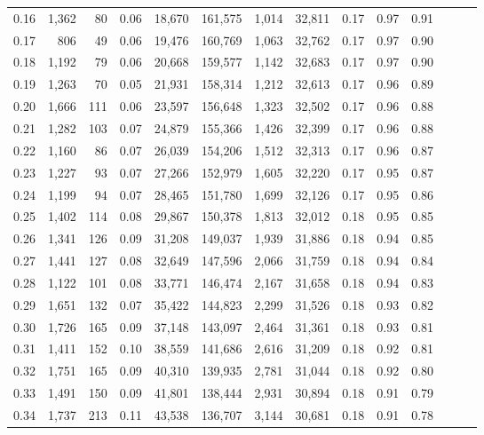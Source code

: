 \begin{tabular}{rrrrrrrrrrrrrr}
0.16 &  1,362 &   80 &  0.06 &   18,670 &  161,575 &   1,014 &  32,811 &  0.17 &  0.97 &      0.91 \\
0.17 &    806 &   49 &  0.06 &   19,476 &  160,769 &   1,063 &  32,762 &  0.17 &  0.97 &      0.90 \\
0.18 &  1,192 &   79 &  0.06 &   20,668 &  159,577 &   1,142 &  32,683 &  0.17 &  0.97 &      0.90 \\
0.19 &  1,263 &   70 &  0.05 &   21,931 &  158,314 &   1,212 &  32,613 &  0.17 &  0.96 &      0.89 \\
0.20 &  1,666 &  111 &  0.06 &   23,597 &  156,648 &   1,323 &  32,502 &  0.17 &  0.96 &      0.88 \\
0.21 &  1,282 &  103 &  0.07 &   24,879 &  155,366 &   1,426 &  32,399 &  0.17 &  0.96 &      0.88 \\
0.22 &  1,160 &   86 &  0.07 &   26,039 &  154,206 &   1,512 &  32,313 &  0.17 &  0.96 &      0.87 \\
0.23 &  1,227 &   93 &  0.07 &   27,266 &  152,979 &   1,605 &  32,220 &  0.17 &  0.95 &      0.87 \\
0.24 &  1,199 &   94 &  0.07 &   28,465 &  151,780 &   1,699 &  32,126 &  0.17 &  0.95 &      0.86 \\
0.25 &  1,402 &  114 &  0.08 &   29,867 &  150,378 &   1,813 &  32,012 &  0.18 &  0.95 &      0.85 \\
0.26 &  1,341 &  126 &  0.09 &   31,208 &  149,037 &   1,939 &  31,886 &  0.18 &  0.94 &      0.85 \\
0.27 &  1,441 &  127 &  0.08 &   32,649 &  147,596 &   2,066 &  31,759 &  0.18 &  0.94 &      0.84 \\
0.28 &  1,122 &  101 &  0.08 &   33,771 &  146,474 &   2,167 &  31,658 &  0.18 &  0.94 &      0.83 \\
0.29 &  1,651 &  132 &  0.07 &   35,422 &  144,823 &   2,299 &  31,526 &  0.18 &  0.93 &      0.82 \\
0.30 &  1,726 &  165 &  0.09 &   37,148 &  143,097 &   2,464 &  31,361 &  0.18 &  0.93 &      0.81 \\
0.31 &  1,411 &  152 &  0.10 &   38,559 &  141,686 &   2,616 &  31,209 &  0.18 &  0.92 &      0.81 \\
0.32 &  1,751 &  165 &  0.09 &   40,310 &  139,935 &   2,781 &  31,044 &  0.18 &  0.92 &      0.80 \\
0.33 &  1,491 &  150 &  0.09 &   41,801 &  138,444 &   2,931 &  30,894 &  0.18 &  0.91 &      0.79 \\
0.34 &  1,737 &  213 &  0.11 &   43,538 &  136,707 &   3,144 &  30,681 &  0.18 &  0.91 &      0.78 \\

\end{tabular}
